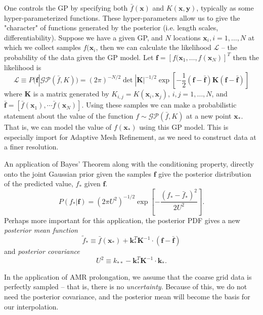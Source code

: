 \documentclass{article}%
\begin{document}
One controls the GP by specifying both $\bar{f}(\mathbf{x})$ and $K(\mathbf{x}, \mathbf{y})$,
typically as some hyper-parameterized functions. These hyper-parameters allow us to give the
"character" of functions generated by the posterior (i.e. length scales, differentiability).
Suppose we have a given GP, and $N$ locations $\mathbf{x}_i, i = 1, \dots, N$ at which we collect
samples $f(\mathbf{x}_i$, then we can calculate the likelihood $\mathcal{L}$ -- the probability of
the data given the GP model. Let
$\mathbf{f} = \left[f(\mathbf{x}_1, \dots, f(\mathbf{x}_N) \right]^T $ then the likelihood is
\begin{equation} 
\mathcal{L} \equiv P(\mathbf{f} | \mathcal{GP}(\bar{f}, K)) = (2\pi)^{-N/2} \det |\mathbf{K}|^{-1/2} 
\exp\left[-\frac{1}{2}\left(\mathbf{f} - \bar{\mathbf{f}}\right)\mathbf{K}
\left(\mathbf{f} - \bar{\mathbf{f}}\right)\right]
\label{eq:likely}
\end{equation}
where $\mathbf{K}$  is a matrix generated by
$K_{i,j} = K(\mathbf{x}_i, \mathbf{x}_j)$, $i, j = 1,\dots, N$,
and $\bar{\mathbf{f}} = [\bar{f}(\mathbf{x}_1), \cdots \bar{f}(\mathbf{x}_N)]$. Using these samples we can make a
probabilistic statement about the value of the function $f \sim \mathcal{GP}(\bar{f}, K)$
at a new point $\mathbf{x}_*$. That is, we can model the value of $f(\mathbf{x}_*)$ using this GP model. This
is especially import for Adaptive Mesh Refinement, as we need to construct data at a finer resolution.

An application of Bayes' Theorem along with the conditioning property, directly onto the joint Gaussian prior
given the samples $\mathbf{f}$ give the posterior distribution of the predicted value, $f_*$ given $\mathbf{f}$.
\begin{equation} 
P(f_* | \mathbf{f}) = (2\pi U^2)^{-1/2} \exp\left[- \frac{(f_* - \bar{f}_*)^2}{2U^2}\right].
\end{equation}
Perhaps more important for this application, the posterior PDF gives a new \textit{posterior mean function}
\begin{equation}
\tilde{f}_* \equiv \bar{f}(\mathbf{x}_*) + \mathbf{k}_*^T\mathbf{K}^{-1}\cdot(\mathbf{f} - \bar{\mathbf{f}})
\label{eq:mean}
\end{equation}
and \textit{posterior covariance}
\begin{equation} 
U^2 \equiv k_{**} - \mathbf{k}_*^T\mathbf{K}^{-1}\cdot\mathbf{k}_*.
\end{equation}

In the application of AMR prolongation, we assume that the coarse grid data is perfectly sampled -- that is, there
is no \textit{uncertainty}. Because of this, we do not need the posterior covariance, and the posterior mean will
become the basis for our interpolation.
\end{document}
